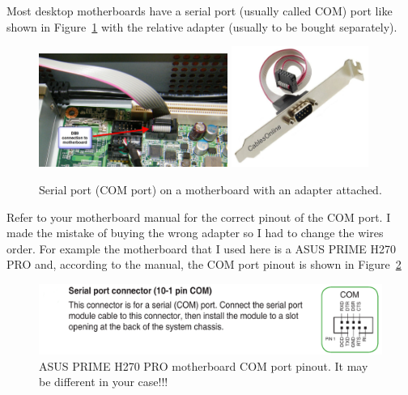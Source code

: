 Most desktop motherboards have a serial port (usually called COM) port like
shown in Figure~\ref{DB9-board-connection} with the relative adapter (usually to
be bought separately).
\begin{figure}[ht]
  \centering
  \includegraphics[width=0.55\textwidth,frame]{DB9-board-connection}\hfill
  \includegraphics[width=0.4\textwidth]{RS-232-adapter}
    \caption{Serial port (COM port) on a motherboard with an adapter
    attached.}\label{DB9-board-connection}
\end{figure}

Refer to your motherboard manual for the correct pinout of the COM port. I made
the mistake of buying the wrong adapter so I had to change the wires order. For
example the motherboard that I used here is a ASUS PRIME H270 PRO and, according
to the manual, the COM port pinout is shown in Figure~\ref{RS232-pinout-PC}
\begin{figure}[H]
  \centering \includegraphics[width=\linewidth]{RS232-pinout-PC}
  \caption{ASUS PRIME H270 PRO motherboard COM port pinout. It may be different
    in your case!!!}\label{RS232-pinout-PC}
\end{figure}

